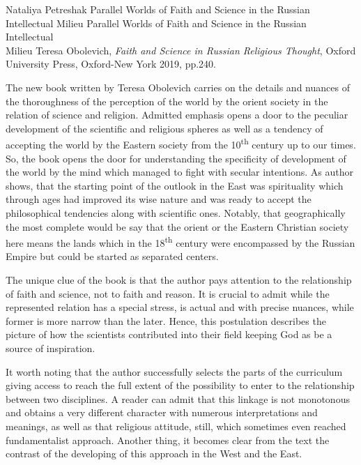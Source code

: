 \begin{recplenv}{Nataliya Petreshak}
	{Parallel Worlds of Faith and Science in the Russian Intellectual Milieu}
	{Parallel Worlds of Faith and Science in the Russian Intellectual\\Milieu}
	{Teresa Obolevich, \textit{Faith and Science in Russian Religious Thought}, Oxford University Press, Oxford-New York 2019,
		pp.240.}
 





The new book written by Teresa Obolevich carries on the details and nuances of the thoroughness of the
perception of the world by the orient society in the relation of science and religion. Admitted emphasis opens a door
to the peculiar development of the scientific and religious spheres as well as a tendency of accepting the world by the
Eastern society from the 10\textsuperscript{th}  century up to our times. So, the book opens the door for understanding
the specificity of development of the world by the mind which managed to fight with secular intentions. As author
shows, that the starting point of the outlook in the East was spirituality which through ages had improved its wise
nature and was ready to accept the philosophical tendencies along with scientific ones. Notably, that geographically
the most complete would be say that the orient or the Eastern Christian society here means the lands which in the
18\textsuperscript{th} century were encompassed by the Russian Empire but could be started as separated centers.


The unique clue of the book is that the author pays attention to the relationship of faith and science, not to faith and
reason. It is crucial to admit while the represented relation has a special stress, is actual and with precise nuances,
while former is more narrow than the later. Hence, this postulation describes the picture of how the scientists
contributed into their field keeping God as be a source of inspiration.


It worth noting that the author successfully selects the parts of the curriculum giving access to reach the full extent
of the possibility to enter to the relationship between two disciplines. A reader can admit that this linkage is not
monotonous and obtains a very different character with numerous interpretations and meanings, as well as that religious
attitude, still, which sometimes even reached fundamentalist approach. Another thing, it becomes clear from the text
the contrast of the developing of this approach in the West and the East.



\end{recplenv}
